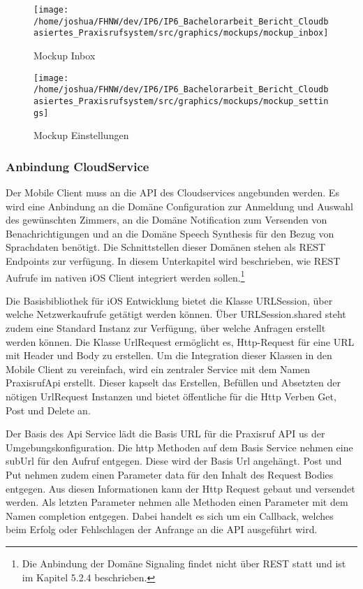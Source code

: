 \begin{figure}[h]
    \centering
    \begin{minipage}[b]{0.4\textwidth}
        \texttt{[image: /home/joshua/FHNW/dev/IP6/IP6\_Bachelorarbeit\_Bericht\_Cloudbasiertes\_Praxisrufsystem/src/graphics/mockups/mockup\_inbox]}
        \caption{Mockup Inbox}
    \end{minipage}
    \hfill
    \begin{minipage}[b]{0.4\textwidth}
        \texttt{[image: /home/joshua/FHNW/dev/IP6/IP6\_Bachelorarbeit\_Bericht\_Cloudbasiertes\_Praxisrufsystem/src/graphics/mockups/mockup\_settings]}
        \caption{Mockup Einstellungen}
    \end{minipage}\label{fig:Mockups-Inbox-Settings}
\end{figure}

\subsubsection{Anbindung CloudService}

Der Mobile Client muss an die API des Cloudservices angebunden werden.
Es wird eine Anbindung an die Domäne Configuration zur Anmeldung und Auswahl des gewünschten Zimmers, an die Domäne Notification zum Versenden von Benachrichtigungen und an die Domäne Speech Synthesis für den Bezug von Sprachdaten benötigt.
Die Schnittstellen dieser Domänen stehen als REST Endpoints zur verfügung.
In diesem Unterkapitel wird beschrieben, wie REST Aufrufe im nativen iOS Client integriert werden sollen.\footnote{Die Anbindung der Domäne Signaling findet nicht über REST statt und ist im Kapitel 5.2.4 beschrieben.}

Die Basisbibliothek für iOS Entwicklung bietet die Klasse URLSession, über welche Netzwerkaufrufe getätigt werden können.
Über URLSession.shared steht zudem eine Standard Instanz zur Verfügung, über welche Anfragen erstellt werden können.\cite{ios_urlsession}
Die Klasse UrlRequest ermöglicht es, Http-Request für eine URL mit Header und Body zu erstellen.\cite{ios_urlrequest}
Um die Integration dieser Klassen in den Mobile Client zu vereinfach, wird ein zentraler Service mit dem Namen PraxisrufApi erstellt.
Dieser kapselt das Erstellen, Befüllen und Absetzten der nötigen UrlRequest Instanzen und bietet öffentliche für die Http Verben Get, Post und Delete an.

Der Basis des Api Service lädt die Basis URL für die Praxisruf API us der Umgebungskonfiguration.
Die http Methoden auf dem Basis Service nehmen eine subUrl für den Aufruf entgegen.
Diese wird der Basis Url angehängt.
Post und Put nehmen zudem einen Parameter data für den Inhalt des Request Bodies entgegen.
Aus diesen Informationen kann der Http Request gebaut und versendet werden.
Als letzten Parameter nehmen alle Methoden einen Parameter mit dem Namen completion entgegen.
Dabei handelt es sich um ein Callback, welches beim Erfolg oder Fehlschlagen der Anfrange an die API ausgeführt wird.

